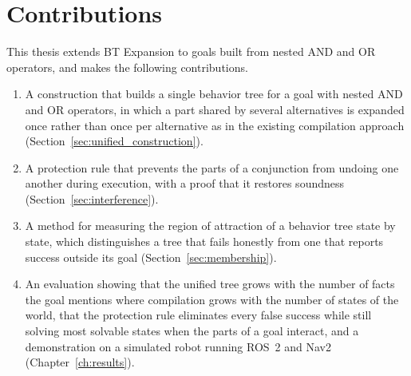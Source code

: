 \section{Contributions}
\label{sec:contributions}
    This thesis extends BT Expansion to goals built from nested AND and OR operators, and makes the following contributions.
    \begin{enumerate}
        \item A construction that builds a single behavior tree for a goal with nested AND and OR operators, in which a part shared by several alternatives is expanded once rather than once per alternative as in the existing compilation approach \cite{chen2024} (Section~\ref{sec:unified_construction}).
        \item A protection rule that prevents the parts of a conjunction from undoing one another during execution, with a proof that it restores soundness (Section~\ref{sec:interference}).
        \item A method for measuring the region of attraction of a behavior tree state by state, which distinguishes a tree that fails honestly from one that reports success outside its goal (Section~\ref{sec:membership}).
        \item An evaluation showing that the unified tree grows with the number of facts the goal mentions where compilation grows with the number of states of the world, that the protection rule eliminates every false success while still solving most solvable states when the parts of a goal interact, and a demonstration on a simulated robot running ROS~2 and Nav2 (Chapter~\ref{ch:results}).
    \end{enumerate}